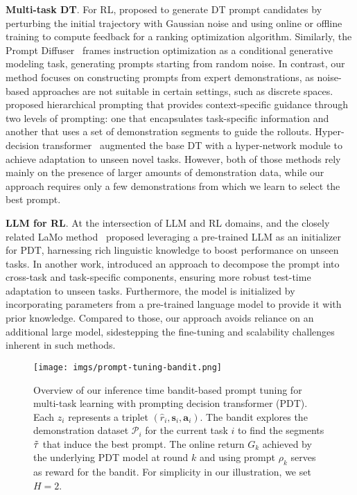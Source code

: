 \documentclass{article} %
\begin{document}
\textbf{Multi-task DT}. For RL, \citet{hu2023prompt} proposed to generate DT prompt candidates by perturbing the initial trajectory with Gaussian noise and using online or offline training to compute feedback for a ranking optimization algorithm. Similarly, the Prompt Diffuser~\citep{hu2024prompt} frames instruction optimization as a conditional generative modeling task, generating prompts starting from random noise. In contrast, our method focuses on constructing prompts from expert demonstrations, as noise-based approaches are not suitable in certain settings, such as discrete spaces. \citet{wang2024hierarchical} proposed hierarchical prompting that provides context-specific guidance through two levels of prompting: one that encapsulates task-specific information and another that uses a set of demonstration segments to guide the rollouts. Hyper-decision transformer~\citep{xu2023hyper} augmented the base DT with a hyper-network module to achieve adaptation to unseen novel tasks. However, both of those methods rely mainly on the presence of larger amounts of demonstration data, while our approach requires only a few demonstrations from which we learn to select the best prompt.

\textbf{LLM for RL}. At the intersection of LLM and RL domains, \citet{yang2024pre} and the closely related LaMo method~\citep{shi2024unleashing} proposed leveraging a pre-trained LLM as an initializer for PDT, harnessing rich linguistic knowledge to boost performance on unseen tasks. In another work, \citet{zhengdecomposed} introduced an approach to decompose the prompt into cross-task and task-specific components, ensuring more robust test-time adaptation to unseen tasks. Furthermore, the model is initialized by incorporating parameters from a pre-trained language model to provide it with prior knowledge. Compared to those, our approach avoids reliance on an additional large model, sidestepping the fine-tuning and scalability challenges inherent in such methods.

\begin{figure*}[tbp]
    \centering
    \texttt{[image: imgs/prompt-tuning-bandit.png]}
    \caption{Overview of our inference time bandit-based prompt tuning for multi-task learning with prompting decision transformer (PDT). Each $z_i$ represents a triplet $(\hat{r}_i, \mathbf{s}_i, \mathbf{a}_i)$. The bandit explores the demonstration dataset $\mathcal{P}_i$ for the current task $i$ to find the segments $\Tilde{\tau}$ that induce the best prompt. The online return $G_k$ achieved by the underlying PDT model at round $k$ and using prompt $\rho_k$ serves as reward for the bandit. For simplicity in our illustration, we set $H=2$.}
    \label{fig:prompt_dt_bandit}
\end{figure*}
\end{document}
